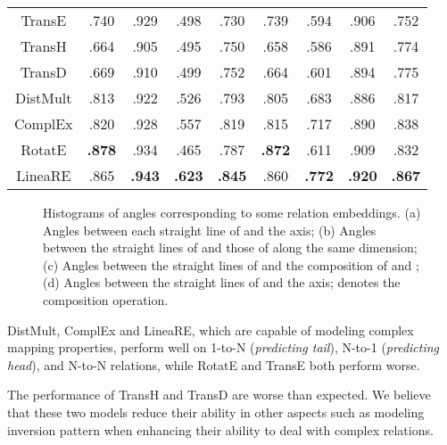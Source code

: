 \documentclass[conference]{IEEEtran}
\begin{document}
\begin{table*}[t]
\begin{tabular}{|c||c|c|c|c||c|c|c|c|}
		TransE \cite{TransE}	& .740	& .929	& .498	& .730	& .739	& .594	& .906	& .752  \\
		TransH \cite{TransH}	& .664	& .905	& .495	& .750	& .658	& .586	& .891	& .774  \\
		TransD \cite{TransH}	& .669	& .910	& .499	& .752	& .664	& .601	& .894	& .775  \\
		DistMult \cite{DistMult}& .813	& .922	& .526	& .793	& .805	& .683	& .886	& .817  \\
		ComplEx \cite{ComplEx}	& .820	& .928	& .557	& .819	& .815	& .717	& .890	& .838  \\
		RotatE \cite{RotatE}	& \textbf{.878}	& .934	& .465	& .787	& \textbf{.872}	& .611	& .909	& .832  \\
		\hline
		LineaRE	& .865	& \textbf{.943}	& \textbf{.623}	& \textbf{.845}	& .860	& \textbf{.772}	& \textbf{.920}	& \textbf{.867}  \\
		\hline
	\end{tabular}
\end{table*}
\begin{figure*}[t]
	\centering
	\caption{
		Histograms of angles corresponding to some relation embeddings. (a) Angles between each straight line of  and the  axis; (b) Angles between the straight lines of   and those of  along the same dimension; (c) Angles between the straight lines of  and the composition of  and ; (d) Angles between the straight lines of  and the  axis;  denotes the composition operation.
	}
	\label{RelationEmbedding}
\end{figure*}
DistMult, ComplEx and LineaRE, which are capable of modeling complex mapping properties, perform well on 1-to-N (\textit{predicting tail}), N-to-1 (\textit{predicting head}), and N-to-N relations, while RotatE and TransE both perform worse.

The performance of TransH and TransD are worse than expected. We believe that these two models reduce their ability in other aspects such as modeling inversion pattern when enhancing their ability to deal with complex relations.
\end{document}
